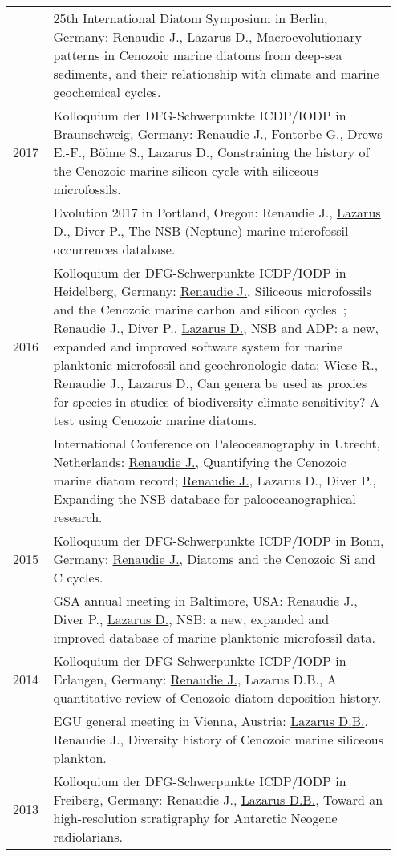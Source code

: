 \documentclass[11pt, a4paper]{article}
\begin{document}
\begin{longtable}{@{}p{0.1\linewidth} P{0.85\linewidth}@{}}
& 25th International Diatom Symposium in Berlin, Germany: \underline{Renaudie J.}, Lazarus D., Macroevolutionary patterns in Cenozoic marine diatoms from deep-sea sediments, and their relationship with climate and marine geochemical cycles.\\
2017 & Kolloquium der DFG-Schwerpunkte ICDP/IODP in Braunschweig, Germany: \underline{Renaudie J.}, Fontorbe G., Drews E.-F., Böhne S., Lazarus D., Constraining the history of the Cenozoic marine silicon cycle with siliceous microfossils.\\
& Evolution 2017 in Portland, Oregon: Renaudie J., \underline{Lazarus D.}, Diver P., The NSB (Neptune) marine microfossil occurrences database.\\
2016 & Kolloquium der DFG-Schwerpunkte ICDP/IODP in Heidelberg, Germany: \underline{Renaudie J.}, Siliceous microfossils and the Cenozoic marine carbon and silicon cycles ; Renaudie J., Diver P., \underline{Lazarus D.}, NSB and ADP: a new, expanded and improved software system for marine planktonic microfossil and geochronologic data; \underline{Wiese R.}, Renaudie J., Lazarus D., Can genera be used as proxies for species in studies of biodiversity-climate sensitivity? A test using Cenozoic marine diatoms.\\
 & International Conference on Paleoceanography in Utrecht, Netherlands: \underline{Renaudie J.}, Quantifying the Cenozoic marine diatom record; \underline{Renaudie J.}, Lazarus D., Diver P., Expanding the NSB database for paleoceanographical research.\\
2015 & Kolloquium der DFG-Schwerpunkte ICDP/IODP in Bonn, Germany: \underline{Renaudie J.}, Diatoms and the Cenozoic Si and C cycles.\\
 & GSA annual meeting in Baltimore, USA: Renaudie J., Diver P., \underline{Lazarus D.}, NSB: a new, expanded and improved database of marine planktonic microfossil data.\\
2014 & Kolloquium der DFG-Schwerpunkte ICDP/IODP in Erlangen, Germany: \underline{Renaudie J.}, Lazarus D.B., A quantitative review of Cenozoic diatom deposition history.\\
 & EGU general meeting in Vienna, Austria: \underline{Lazarus D.B.}, Renaudie J., Diversity history of Cenozoic marine siliceous plankton.\\
2013 & Kolloquium der DFG-Schwerpunkte ICDP/IODP in Freiberg, Germany: Renaudie J., \underline{Lazarus D.B.}, Toward an high-resolution stratigraphy for Antarctic Neogene radiolarians.\\

\end{longtable}
\end{document}
